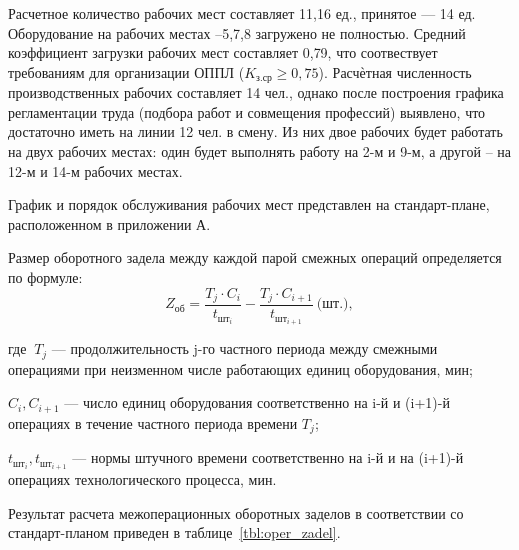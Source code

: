 Расчетное количество рабочих мест составляет 11{,}16 ед.,
принятое --- 14 ед.
Оборудование на рабочих местах \textnumero {}--5,7,8 
загружено не полностью.
Средний коэффициент загрузки рабочих мест составляет 0{,}79, что соотвествует
требованиям для организации ОППЛ (\( K_{\text{з.ср}} \ge 0{,}75 \)).
Расчѐтная численность производственных рабочих составляет 14 чел.,
однако после построения графика регламентации труда
(подбора работ и совмещения профессий) выявлено, что достаточно
иметь на линии 12 чел. в смену.
Из них двое рабочих будет работать на двух рабочих местах:
один будет выполнять работу на 2-м и 9-м, а другой – на 12-м и
14-м рабочих местах.

График и порядок обслуживания рабочих мест представлен на стандарт-плане,
расположенном в приложении А.

Размер оборотного задела между каждой парой смежных операций определяется 
по формуле:
\begin{equation*}
  Z_{\text{об}} = 
  \dfrac{T_j \cdot C_i}{t_{\text{шт}_i}} - \dfrac{T_j \cdot C_{i+1}}{t_{\text{шт}_{i+1}}} 
  \: \text{(шт.)},
\end{equation*}

\noindent где \( \: T_j \) --- продолжительность j-го частного периода между
смежными операциями при неизменном числе работающих единиц оборудования, мин;

\( C_i, C_{i+1} \) --- число единиц оборудования соответственно на i-й и 
(i+1)-й операциях в течение частного периода времени \( T_j \);

\( t_{\text{шт}_i}, t_{\text{шт}_{i+1}}\) --- нормы штучного времени соответственно на
i-й и на (i+1)-й операциях технологического процесса, мин.

Результат расчета межоперационных оборотных заделов в соответствии со 
стандарт-планом приведен в таблице~\ref{tbl:oper_zadel}.

